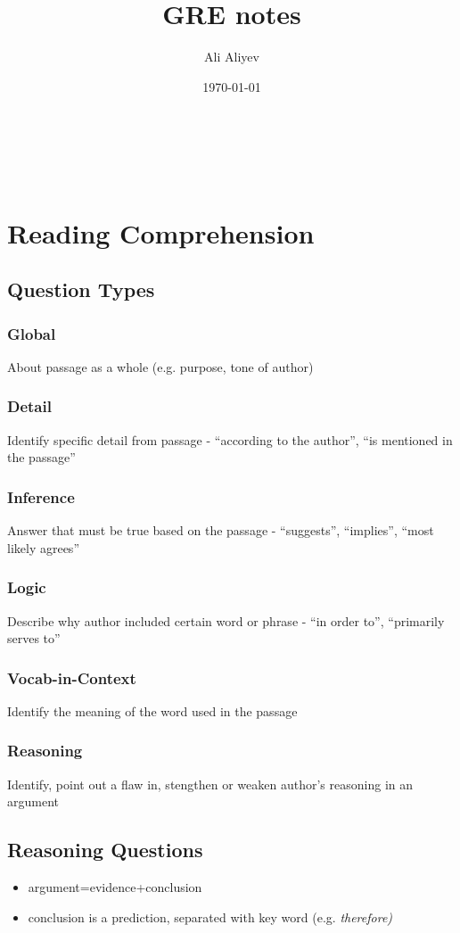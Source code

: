 \documentclass[paper=a4]{article}
\renewcommand{\maketitle}{
\begin{center}
	{\huge\bfseries\thetitle\\
	\em\large\bfseries\theauthor\\
	\thedate
	}
\end{center}
}
\begin{document}
\author{Ali Aliyev}
\date{\today}
\title{GRE notes}
\maketitle

\section{Reading Comprehension}

\subsection{Question Types}

\subsubsection{Global}
About passage as a whole (e.g. purpose, tone of author)
\subsubsection{Detail}
Identify specific detail from passage - ``according to the author'', ``is mentioned in the passage''
\subsubsection{Inference}
Answer that must be true based on the passage - ``suggests'', ``implies'', ``most likely agrees''
\subsubsection{Logic}
Describe why author included certain word or phrase - ``in order to'', ``primarily serves to''
\subsubsection{Vocab-in-Context}
Identify the meaning of the word used in the passage
\subsubsection{Reasoning}
Identify, point out a flaw in, stengthen or weaken author's reasoning in an argument



\subsection{Reasoning Questions}
\begin{itemize}
\item argument=evidence+conclusion
\item conclusion is a prediction, separated with key word (e.g. \em therefore)
\end{itemize}
\end{document}

